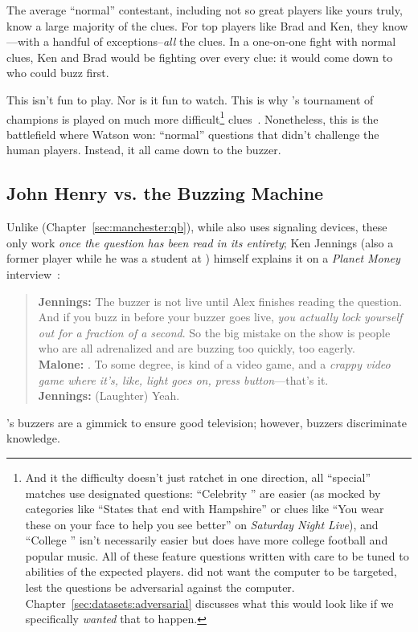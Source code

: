 The average ``normal'' \jeopardy{} contestant, including not so great
players like yours truly, know a large majority of the clues.
%
For top players like Brad and Ken, they know---with a handful of
exceptions--\emph{all} the clues.
%
In a one-on-one fight with normal clues, Ken and Brad would be fighting over
every clue: it would come down to who could buzz first.

This isn't fun to play.
%
Nor is it fun to watch.
%
This is why \jeopardy{}'s tournament of champions is played on much more
difficult\footnote{And it the difficulty doesn't just ratchet in one
  direction, all ``special'' matches use designated questions: ``Celebrity
  \jeopardy{}'' are easier (as mocked by categories like ``States that end
  with Hampshire'' or clues like ``You wear these on your face to help you see
  better'' on \textit{Saturday Night Live}), and ``College \jeopardy{}'' isn't
  necessarily easier but does have more college football and popular music.
  All of these feature questions written with care to be tuned to abilities of
  the expected players.   did not want the computer to be targeted,
  lest the questions be adversarial against the computer.
  Chapter~\ref{sec:datasets:adversarial} discusses what this would look like if we
  specifically \emph{wanted} that to happen.} clues~\citep{harris-06}.
%
Nonetheless, this is the battlefield where Watson won: ``normal''
questions that didn't challenge the human players.
%
Instead, it all came down to the buzzer.

\subsection{John Henry vs. the Buzzing Machine}
\label{sec:watson:human-buzzing}

Unlike \qb{} (Chapter~\ref{sec:manchester:qb}), while \jeopardy{} also uses
signaling devices, these only work \emph{once the question has been
  read in its entirety}; Ken Jennings (also a former \qb{} player while he was a student at
) himself explains it on a \textit{Planet Money}
interview~\citep{malone-19}:
\begin{quote}
{\bf Jennings:} The buzzer is
    not live until Alex finishes reading the question. And if you buzz
    in before your buzzer goes live, \emph{you actually lock yourself out
    for a fraction of a second}. So the big mistake on the show is
    people who are all adrenalized and are buzzing too quickly, too
    eagerly. \\
{\bf Malone:} . To some degree, \jeopardy{} is kind of a video game, and a \emph{crappy video game where it's, like, light goes on, press button}---that's it. \\
{\bf Jennings:} (Laughter) Yeah. \\
\end{quote}
\jeopardy{}'s buzzers are a gimmick to ensure good television; however, \qb{}
buzzers discriminate knowledge.

